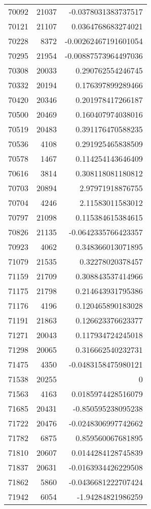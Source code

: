 \begin{tabular}{r | r | r}
70092 & 21037 & -0.0378031383737517 \\
70121 & 21107 & 0.0364768683274021 \\
70228 & 8372 & -0.00262467191601054 \\
70295 & 21954 & -0.00887573964497036 \\
70308 & 20033 & 0.290762554246745 \\
70332 & 20194 & 0.176397899289466 \\
70420 & 20346 & 0.201978417266187 \\
70500 & 20469 & 0.160407974038016 \\
70519 & 20483 & 0.391176470588235 \\
70536 & 4108 & 0.291925465838509 \\
70578 & 1467 & 0.114254143646409 \\
70616 & 3814 & 0.308118081180812 \\
70703 & 20894 & 2.97971918876755 \\
70704 & 4246 & 2.11583011583012 \\
70797 & 21098 & 0.115384615384615 \\
70826 & 21135 & -0.0642335766423357 \\
70923 & 4062 & 0.348366013071895 \\
71079 & 21535 & 0.32278020378457 \\
71159 & 21709 & 0.308843537414966 \\
71175 & 21798 & 0.214643931795386 \\
71176 & 4196 & 0.120465890183028 \\
71191 & 21863 & 0.126623376623377 \\
71271 & 20043 & 0.117934724245018 \\
71298 & 20065 & 0.316662540232731 \\
71475 & 4350 & -0.0483158475980121 \\
71538 & 20255 & 0 \\
71563 & 4163 & 0.0185974428516079 \\
71685 & 20431 & -0.850595238095238 \\
71722 & 20476 & -0.0248306997742662 \\
71782 & 6875 & 0.859560067681895 \\
71810 & 20607 & 0.0144284128745839 \\
71837 & 20631 & -0.0163934426229508 \\
71862 & 5860 & -0.0436681222707424 \\
71942 & 6054 & -1.94284821986259 \\

\end{tabular}
